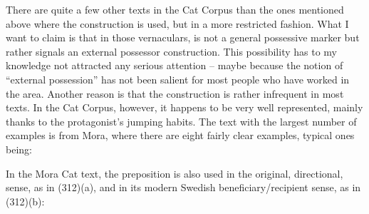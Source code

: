 {%
There are quite a few other texts in the Cat Corpus than the ones mentioned above where the construction is used, but in a more restricted fashion. What I want to claim is that in those vernaculars, is not a general possessive marker but rather signals an external possessor construction. This possibility has to my knowledge not attracted any serious attention – maybe because the notion of “external possession” has not been salient for most people who have worked in the area. Another reason is that the construction is rather infrequent in most texts. In the Cat Corpus, however, it happens to be very well represented, mainly thanks to the protagonist’s jumping habits. The text with the largest number of examples is from Mora, where there are eight fairly clear examples, typical ones being:


\ea\label{}

\z 
\z

In the Mora Cat text, the preposition is also used in the original, directional, sense, as in (312)(a), and in its modern Swedish beneficiary/recipient sense, as in (312)(b):


\ea\label{}

\z 
\z

}
